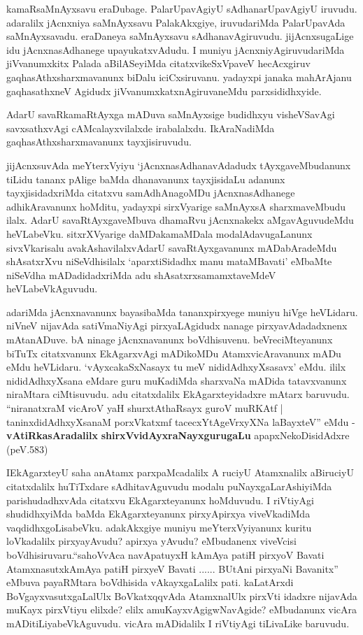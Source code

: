 \begin{artha}
kamaRsaMnAyxsavu eraDubage. PalarUpavAgiyU sAdhanarUpavAgiyU
iruvudu. adaralilx jAcnxniya saMnAyxsavu PalakAkxgiye, iruvudariMda
PalarUpa\-vAda saMnAyxsavadu. eraDaneya saMnAyxsavu
sAdhanavAgiruvudu. jijAcnxsugaLige idu jAcnxnasAdhanege
upayukatxvAdudu. I muniyu jAcnxniyAgiruvudariMda jiVvanumxkitx Palada aBilASeyiMda citatxvikeSxVpaveV hecAcxgiruv gaqhasAthxsharxmavanunx biDalu iciCxsiruvanu. yadayxpi janaka mahArAjanu gaqhasathxneV Agidudx
jiVvanumxkatxnAgiruvaneMdu parxsididhxyide. 

AdarU savaRkamaRtAyxga mADuva saMnAyxsige budidhxyu visheVSavAgi
savxsathxvAgi cAMcalayxvilalxde irabalalxdu. IkAraNadiMda
gaqhasAthxsharxmavanunx tayxjisiruvudu.

jijAcnxsuvAda meYterxVyiyu `jAcnxnasAdhanavAdadudx tAyxgaveMbudanunx
tiLidu tananx pAlige baMda dhanavanunx tayxjisidaLu adanunx
tayxjisidadxriMda citatxvu samAdhAnagoMDu jAcnxnasAdhanege
adhikAravanunx hoMditu, yadayxpi sirxVyarige saMnAyxsA sharxmaveMbudu
ilalx. AdarU savaRtAyxgaveMbuva dhamaRvu jAcnxnakekx aMgavAguvudeMdu
heVLabeVku. sitxrXVyarige daMDakamaMDala modalAdavugaLanunx
sivxVkarisalu avakAshavilalxvAdarU savaRtAyxgavanunx mADabAradeMdu
shAsatxrXvu niSeVdhisilalx `aparxtiSidadhx manu mataMBavati' eMbaMte niSeVdha mADadidadxriMda
adu shAsatxrxsamamxtaveMdeV heVLabeVkAguvudu.

adariMda  jAcnxnavanunx bayasibaMda tananxpirxyege muniyu hiVge
heVLidaru. niVneV nijavAda satiVmaNiyAgi pirxyaLAgidudx nanage
pirxyavAdadadxnenx mAta\-nADuve. bA ninage jAcnxnavanunx
boVdhisuvenu. beVreciMteyanunx biTuTx citatxvanunx EkAgarxvAgi
mADikoMDu AtamxvicAravanunx mADu eMdu heVLidaru. `vAyxcakaSxNasayx tu meV nididAdhxyXsasavx' eMdu. ililx
nididAdhxyXsana eMdare guru muKadiMda sharxvaNa mADida tatavxvanunx
niraMtara ciMtisuvudu. adu citatxdalilx EkAgarxteyidadxre mAtarx
baruvudu. ``niranatxraM vicAroV yaH shurxtAthaRsayx guroV muRKAtf | \-taninxdidAdhxyXsanaM porxVkatxmf tacecxYtAgeVrxyXNa laBayxteV'' eMdu - \textbf{vAtiRkasAradalilx}\textbf{ shirxVvidAyxraNayxgurugaLu} 
apapxNekoDisidAdxre (peV.583)
\end{artha}

\begin{artha}
IEkAgarxteyU saha anAtamx parxpaMcadalilx A ruciyU Atamxnalilx
aBi\-ruciyU citatxdalilx huTiTxdare sAdhitavAguvudu modalu
puNayxgaLarAshiyiMda parishudadhxvAda citatxvu EkAgarxteyanunx
hoMduvudu. I riVtiyAgi shudidhxyiMda baMda EkAgarxteyanunx
pirxyApirxya viveVkadiMda vaqdidhxgoLisabeVku. adakAkxgiye  muniyu
meYterxVyiyanunx kuritu loVkadalilx pirxyayAvudu? apirxya yAvudu?
eMbudanenx viveVcisi boVdhisiruvaru.``sahoVvAca navApatuyxH kAmAya patiH pirxyoV Bavati AtamxnasutxkAmAya patiH pirxyeV Bavati ...... BUtAni pirxyaNi \-Bavanitx'' eMbuva payaRMtara
boVdhisida vAkayxgaLalilx pati. kaLatArxdi BoVgayxvasutxgaLalUlx
BoVkatxqqvAda AtamxnalUlx pirxVti idadxre nijavAda muKayx pirxVtiyu
elilxde? elilx amuKayxvAgigwNavAgide? eMbudanunx vicAra
mADitiLiyabeVkAguvudu. vicAra mADidalilx I riVtiyAgi tiLivaLike baruvudu.
\end{artha}

